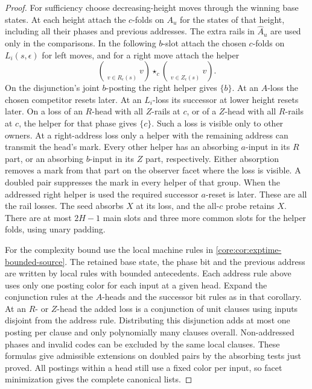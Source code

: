 \begin{proof}
For sufficiency choose decreasing-height moves through the winning
base states. At each height attach the $c$-folds on $A_u$ for the
states of that height, including all their phases and previous
addresses. The extra rails in $\widehat A_u$ are used only in the
comparisons. In the following $b$-slot attach the chosen
$c$-folds on $L_i(s,\epsilon)$ for left moves, and for a right move
attach the helper
\[
   \left(\mathop{\star_a}\limits_{v\in R_\epsilon(s)} v\right)
       \star_c
   \left(\mathop{\star_b}\limits_{v\in Z_\epsilon(s)} v\right).
\]
On the disjunction's joint $b$-posting the right helper gives
$\{b\}$. At an $A$-loss the chosen competitor resets later. At
an $L_i$-loss its successor at lower height resets later.
On a loss of an $R$-head with all $Z$-rails at $c$, or of a
$Z$-head with all $R$-rails at $c$, the helper for that phase
gives $\{c\}$. Such a loss is visible only to other owners.
At a right-address loss only a helper with the remaining address
can transmit the head's mark. Every other helper has an absorbing
$a$-input in its $R$ part, or an absorbing $b$-input in its $Z$
part, respectively. Either absorption removes a mark from that
part on the observer facet where the loss is visible. A doubled
pair suppresses the mark in every helper of that group. When
the addressed right helper is used the required successor
$a$-reset is later. These are all the rail losses. The seed
absorbs $X$ at its loss, and the all-$c$ probe retains $X$.
There are at most $2H-1$ main slots and three more common slots
for the helper folds, using unary padding.

For the complexity bound use the local machine rules in
\cref{core:cor:exptime-bounded-source}. The retained base state,
the phase bit and the previous address are written by local rules
with bounded antecedents. Each address rule above uses only
one posting color for each input at a given head. Expand the
conjunction rules at the $A$-heads and the successor bit rules
as in that corollary. At an $R$- or $Z$-head the added loss is a
conjunction of unit clauses using inputs disjoint from the
address rule. Distributing this disjunction adds at most one
posting per clause and only polynomially many clauses overall.
Non-addressed phases and invalid codes can be excluded by the
same local clauses. These formulas give admissible extensions
on doubled pairs by the absorbing tests just proved. All
postings within a head still use a fixed color per input, so
facet minimization gives the complete canonical lists.
\end{proof}

